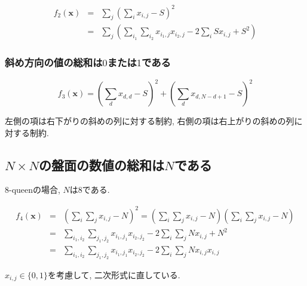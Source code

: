 \documentclass[uplatex,dvipdfmx,a4paper,11pt,oneside,openany]{jsbook}
\begin{document}
\begin{eqnarray*}
f_2(\bm{x})&=&\sum_j\left(\sum_i x_{i,j}-S\right)^2\\
&=&\sum_j\left(\sum_{i_1}\sum_{i_2}x_{i_1,j}x_{i_2,j} - 2 \sum_i S x_{i,j} + S^2\right)
\end{eqnarray*}

\subsubsection{斜め方向の値の総和は$0$または$1$である}

\[
f_3(\bm{x}) = \left(\sum_d x_{d,d} - S \right)^2 + \left(\sum_d x_{d,N-d+1} - S \right)^2
\]

左側の項は右下がりの斜めの列に対する制約, 右側の項は右上がりの斜めの列に対する制約.

\subsection{$N\times N$の盤面の数値の総和は$N$である}

8-queenの場合, $N$は$8$である.

\begin{eqnarray*}
f_4(\bm{x})&=&\left(\sum_i\sum_j x_{i,j} - N\right)^2=\left(\sum_i\sum_j x_{i,j} - N\right)\left(\sum_i\sum_j x_{i,j} - N\right)\\
&=&\sum_{i_1,i_2}\sum_{j_1,j_2}x_{i_1,j_1}x_{i_2,j_2}-2\sum_i\sum_j N x_{i,j} + N^2\\
&=&\sum_{i_1,i_2}\sum_{j_1,j_2}x_{i_1,j_1}x_{i_2,j_2} -2\sum_i\sum_j N x_{i,j}x_{i,j}
\end{eqnarray*}

$x_{i,j}\in \{0,1\}$を考慮して, 二次形式に直している.




\end{document}

